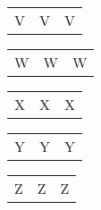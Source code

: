 \documentclass{minimal}
\begin{document}
\begin{longtable}{p{2.8cm}p{2.8cm}p{2.8cm}}
V & V & V
\end{longtable}

\begin{longtable}{p{2.8cm}p{2.8cm}p{2.8cm}}
W & W & W
\end{longtable}

\begin{longtable}{p{2.8cm}p{2.8cm}p{2.8cm}}
X & X & X
\end{longtable}

\begin{longtable}{p{2.8cm}p{2.8cm}p{2.8cm}}
Y & Y & Y
\end{longtable}

\begin{longtable}{p{2.8cm}p{2.8cm}p{2.8cm}}
Z & Z & Z
\end{longtable}
\end{document}
